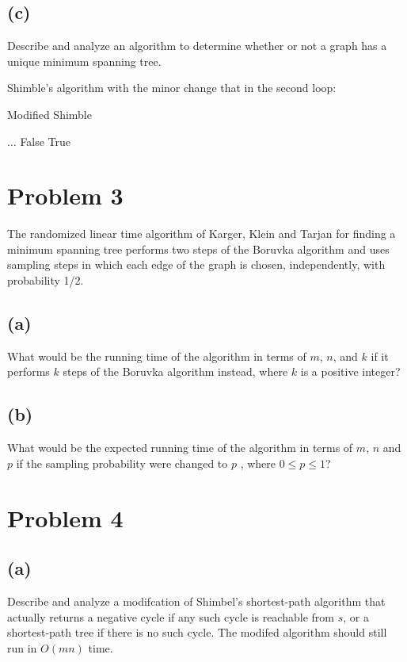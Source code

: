\documentclass[12pt]{article}
\begin{document}
\subsection*{(c)}
Describe and analyze an algorithm to determine whether or not a graph
has a unique minimum spanning tree.

Shimble's algorithm with the minor change that in the second loop:
\begin{algorithm}
\caption{Modified Shimble}
\begin{algorithmic}
  \STATE
  \STATE $\ldots$
  \STATE
      \RETURN False
    \ENDIF
  \RETURN True
  \ENDFOR
\end{algorithmic}
\end{algorithm}


\section*{Problem 3}
The randomized linear time algorithm of Karger, Klein and Tarjan for
finding a minimum spanning tree performs two steps of the Boruvka
algorithm and uses sampling steps in which each edge of the graph is
chosen, independently, with probability 1/2.

\subsection*{(a)}
What would be the running time of the algorithm in terms of $m$, $n$,
and $k$ if it performs $k$ steps of the Boruvka algorithm instead,
where $k$ is a positive integer?

\subsection*{(b)}
 What would be the expected running time of the algorithm in terms of
 $m$, $n$ and $p$ if the sampling probability were changed to $p$ ,
 where $0 \le p \le 1$?

\pagebreak

\section*{Problem 4}

\subsection*{(a)}
Describe and analyze a modifcation of Shimbel's shortest-path algorithm
that actually returns a negative cycle if any such cycle is reachable
from $s$, or a shortest-path tree if there is no such cycle. The modifed
algorithm should still run in $O(mn)$ time.
\end{document}
